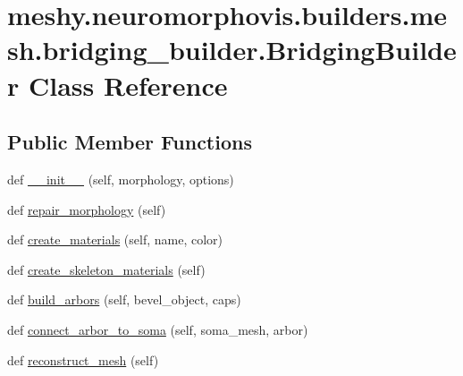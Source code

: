 \hypertarget{classmeshy_1_1neuromorphovis_1_1builders_1_1mesh_1_1bridging__builder_1_1BridgingBuilder}{}\section{meshy.\+neuromorphovis.\+builders.\+mesh.\+bridging\+\_\+builder.\+Bridging\+Builder Class Reference}
\label{classmeshy_1_1neuromorphovis_1_1builders_1_1mesh_1_1bridging__builder_1_1BridgingBuilder}


 


\subsection*{Public Member Functions}
\begin{DoxyCompactItemize}
\item 
def \hyperlink{classmeshy_1_1neuromorphovis_1_1builders_1_1mesh_1_1bridging__builder_1_1BridgingBuilder_a58a54803c4de3e351cea7feb5a2b4f59}{\+\_\+\+\_\+init\+\_\+\+\_\+} (self, morphology, options)
\item 
def \hyperlink{classmeshy_1_1neuromorphovis_1_1builders_1_1mesh_1_1bridging__builder_1_1BridgingBuilder_a7ac94ad0930c921023a4646fba240682}{repair\+\_\+morphology} (self)
\item 
def \hyperlink{classmeshy_1_1neuromorphovis_1_1builders_1_1mesh_1_1bridging__builder_1_1BridgingBuilder_a2e99b3b2232d9303a12828eca5f2f5cd}{create\+\_\+materials} (self, name, color)
\item 
def \hyperlink{classmeshy_1_1neuromorphovis_1_1builders_1_1mesh_1_1bridging__builder_1_1BridgingBuilder_a66fd1945a1f8582a6d875f25be79712d}{create\+\_\+skeleton\+\_\+materials} (self)
\item 
def \hyperlink{classmeshy_1_1neuromorphovis_1_1builders_1_1mesh_1_1bridging__builder_1_1BridgingBuilder_a7b556b30668b5f1bd2dc6aad6b767387}{build\+\_\+arbors} (self, bevel\+\_\+object, caps)
\item 
def \hyperlink{classmeshy_1_1neuromorphovis_1_1builders_1_1mesh_1_1bridging__builder_1_1BridgingBuilder_acc3821adb14b90340c816387721ba803}{connect\+\_\+arbor\+\_\+to\+\_\+soma} (self, soma\+\_\+mesh, arbor)\hypertarget{classmeshy_1_1neuromorphovis_1_1builders_1_1mesh_1_1bridging__builder_1_1BridgingBuilder_acc3821adb14b90340c816387721ba803}{}\label{classmeshy_1_1neuromorphovis_1_1builders_1_1mesh_1_1bridging__builder_1_1BridgingBuilder_acc3821adb14b90340c816387721ba803}

\item 
def \hyperlink{classmeshy_1_1neuromorphovis_1_1builders_1_1mesh_1_1bridging__builder_1_1BridgingBuilder_a4906e5b970c09a0706c11f9215f41b5a}{reconstruct\+\_\+mesh} (self)
\end{DoxyCompactItemize}
